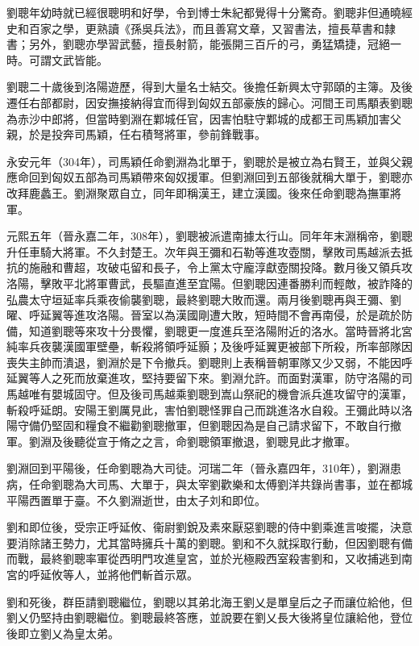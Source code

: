 劉聰年幼時就已經很聰明和好學，令到博士朱紀都覺得十分驚奇。劉聰非但通曉經史和百家之學，更熟讀《孫吳兵法》，而且善寫文章，又習書法，擅長草書和隸書；另外，劉聰亦學習武藝，擅長射箭，能張開三百斤的弓，勇猛矯捷，冠絕一時。可謂文武皆能。

劉聰二十歲後到洛陽遊歷，得到大量名士結交。後擔任新興太守郭頤的主簿。及後遷任右部都尉，因安撫接納得宜而得到匈奴五部豪族的歸心。河間王司馬顒表劉聰為赤沙中郎將，但當時劉淵在鄴城任官，因害怕駐守鄴城的成都王司馬穎加害父親，於是投奔司馬穎，任右積弩將軍，參前鋒戰事。

永安元年（304年），司馬穎任命劉淵為北單于，劉聰於是被立為右賢王，並與父親應命回到匈奴五部為司馬穎帶來匈奴援軍。但劉淵回到五部後就稱大單于，劉聰亦改拜鹿蠡王。劉淵聚眾自立，同年即稱漢王，建立漢國。後來任命劉聰為撫軍將軍。

元熙五年（晉永嘉二年，308年），劉聰被派遣南據太行山。同年年末淵稱帝，劉聰升任車騎大將軍。不久封楚王。次年與王彌和石勒等進攻壺關，擊敗司馬越派去抵抗的施融和曹超，攻破屯留和長子，令上黨太守龐淳獻壺關投降。數月後又領兵攻洛陽，擊敗平北將軍曹武，長驅直進至宜陽。但劉聰因連番勝利而輕敵，被詐降的弘農太守垣延率兵乘夜偷襲劉聰，最終劉聰大敗而還。兩月後劉聰再與王彌、劉曜、呼延翼等進攻洛陽。晉室以為漢國剛遭大敗，短時間不會再南侵，於是疏於防備，知道劉聰等來攻十分畏懼，劉聰更一度進兵至洛陽附近的洛水。當時晉將北宮純率兵夜襲漢國軍壁壘，斬殺將領呼延顥；及後呼延翼更被部下所殺，所率部隊因喪失主帥而潰退，劉淵於是下令撤兵。劉聰則上表稱晉朝軍隊又少又弱，不能因呼延翼等人之死而放棄進攻，堅持要留下來。劉淵允許。而面對漢軍，防守洛陽的司馬越唯有嬰城固守。但及後司馬越乘劉聰到嵩山祭祀的機會派兵進攻留守的漢軍，斬殺呼延朗。安陽王劉厲見此，害怕劉聰怪罪自己而跳進洛水自殺。王彌此時以洛陽守備仍堅固和糧食不繼勸劉聰撤軍，但劉聰因為是自己請求留下，不敢自行撤軍。劉淵及後聽從宣于脩之之言，命劉聰領軍撤退，劉聰見此才撤軍。

劉淵回到平陽後，任命劉聰為大司徒。河瑞二年（晉永嘉四年，310年），劉淵患病，任命劉聰為大司馬、大單于，與太宰劉歡樂和太傅劉洋共錄尚書事，並在都城平陽西置單于臺。不久劉淵逝世，由太子刘和即位。

劉和即位後，受宗正呼延攸、衞尉劉銳及素來厭惡劉聰的侍中劉乘進言唆擺，決意要消除諸王勢力，尤其當時擁兵十萬的劉聰。劉和不久就採取行動，但因劉聰有備而戰，最終劉聰率軍從西明門攻進皇宮，並於光極殿西室殺害劉和，又收捕逃到南宮的呼延攸等人，並將他們斬首示眾。

劉和死後，群臣請劉聰繼位，劉聰以其弟北海王劉乂是單皇后之子而讓位給他，但劉乂仍堅持由劉聰繼位。劉聰最終答應，並說要在劉乂長大後將皇位讓給他，登位後即立劉乂為皇太弟。

